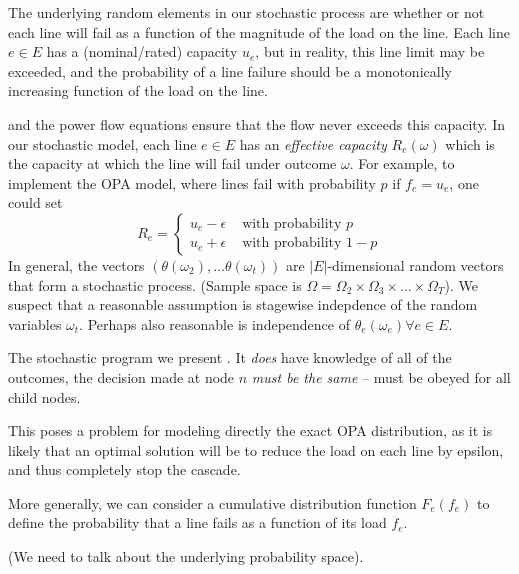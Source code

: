 The underlying random elements in our stochastic process are whether
or not each line will fail as a function of the magnitude of the load
on the line.  Each line $e \in E$ has a (nominal/rated) capacity
$u_e$, but in reality, this line limit may be exceeded, and the
probability of a line failure should be a monotonically increasing
function of the load on the line.

and the power 
flow equations ensure that the flow never exceeds this capacity.  In
our stochastic model, each line $e \in E$ has an {\em effective
  capacity} $R_e(\omega)$ which is the capacity at which the
line will fail under outcome $\omega$.  For example, to implement the
OPA model, where lines fail with probability $p$ if $f_{e} = u_{e}$,
one could set
\[ 
R_e = \begin{cases} 
u_e - \epsilon & \mbox{ with probability } p\\
u_e + \epsilon & \mbox{ with probability } 1-p
\end{cases}
\]
In general, the vectors $(\theta(\omega_2), \ldots \theta(\omega_t))$
are $|E|$-dimensional random vectors that form a stochastic process.
(Sample space is $\Omega = \Omega_2 \times \Omega_3 \times \ldots
\times \Omega_T$).  We suspect that a reasonable assumption is
stagewise indepdence of the random variables $\omega_t$.  Perhaps also
reasonable is independence of $\theta_e(\omega_e) \forall e \in E$.

The stochastic program we present .  It {\em does} have knowledge of
all of the outcomes, the decision made at node $n$ {\em must be the
  same} -- must be obeyed for all child nodes.

This poses a problem for modeling directly the exact OPA distribution,
as it is likely that an optimal solution will be to reduce the load on
each line by epsilon, and thus completely stop the cascade.

More generally, we can consider a cumulative distribution function
$F_e(f_e)$ to define the probability that a line fails as a function of
its load $f_e$.




(We need to talk about the underlying probability space).





